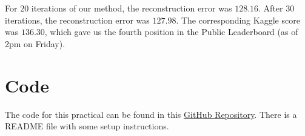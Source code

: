 \documentclass[10pt]{article}
\begin{document}
For $20$ iterations of our method, the reconstruction error was $128.16$. After $30$ iterations, the reconstruction error was $127.98$. The corresponding Kaggle score was $136.30$, which gave us the fourth position in the Public Leaderboard (as of 2pm on Friday). 

\section{Code}

The code for this practical can be found in this \href{https://github.com/victordomene/cs181-practicals/tree/master/practical3}{GitHub Repository}. There is a README file with some setup instructions.
\end{document}
